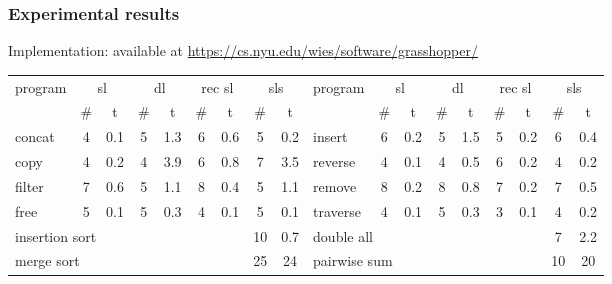 \documentclass{beamer}
\begin{document}
\begin{frame}
  \frametitle{Experimental results}

Implementation: \Tool available at \url{https://cs.nyu.edu/wies/software/grasshopper/}

\begin{table}[t]%
{\tiny
\centering
\renewcommand{\tabcolsep}{0.14cm}
\begin{tabular}{|l|c|c|c|c|c|c|c|c||l|c|c|c|c|c|c|c|c|}
\hline
program & \multicolumn{2}{|c|}{sl} & \multicolumn{2}{|c|}{dl} & \multicolumn{2}{|c|}{rec sl} & \multicolumn{2}{|c||}{sls} & 

program & \multicolumn{2}{|c|}{sl}  & \multicolumn{2}{|c|}{dl} & \multicolumn{2}{|c|}{rec sl} & \multicolumn{2}{|c|}{sls}
\\

\cline{2-9}
\cline{11-18}

& \# & t & \# & t & \# & t & \# & t &
& \# & t & \# & t & \# & t & \# & t \\

\hline

concat & 4 & 0.1 & 5 & 1.3 & 6 & 0.6 & 5 & 0.2 & 
insert & 6 & 0.2 & 5 & 1.5 & 5 & 0.2 & 6 & 0.4 \\


copy    & 4 & 0.2 & 4 & 3.9 & 6 & 0.8 & 7 & 3.5 & 
reverse & 4 & 0.1 & 4 & 0.5 & 6 & 0.2 & 4 & 0.2 \\


filter & 7 & 0.6 & 5 & 1.1 & 8 & 0.4 & 5 & 1.1 & 
remove & 8 & 0.2 & 8 & 0.8 & 7 & 0.2 & 7 & 0.5 \\


free     & 5 & 0.1 & 5 & 0.3 & 4 & 0.1 & 5 & 0.1 & 
traverse & 4 & 0.1 & 5 & 0.3 & 3 & 0.1 & 4 & 0.2 \\

\cline{2-7}
\cline{11-16}


\multicolumn{7}{|l|}{insertion sort} & 10 & 0.7 &
\multicolumn{7}{|l|}{double all} & 7 & 2.2\\

\multicolumn{7}{|l|}{merge sort} & 25 & 24 &
\multicolumn{7}{|l|}{pairwise sum} & 10 & 20 \\
\hline
\end{tabular}
}
\end{table}


\end{frame}
\end{document}
